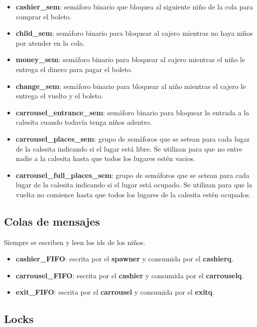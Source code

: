 \documentclass[a4paper,10pt]{article}
\begin{document}
\begin{itemize}
\item \textbf{cashier\_sem}: semáforo binario que bloquea al siguiente niño de la cola para comprar el boleto. 
\item \textbf{child\_sem}: semáforo binario para bloquear al cajero mientras no haya niños por atender en la cola.
\item \textbf{money\_sem}: semáforo binario para bloquear al cajero mientras el niño le entrega el dinero para pagar el boleto.
\item \textbf{change\_sem}: semáforo binario para bloquear al niño mientras el cajero le entrega el vuelto y el boleto.
\item \textbf{carrousel\_entrance\_sem}: semáforo binario para bloquear la entrada a la calesita cuando todavía tenga niños adentro.
\item \textbf{carrousel\_places\_sem}: grupo de semáforos que se setean para cada lugar de la calesita indicando si el lugar está libre. Se utilizan para que no entre nadie a la calesita hasta que todos los lugares estén vacios.
\item \textbf{carrousel\_full\_places\_sem}: grupo de semáforos que se setean para cada lugar de la calesita indicando si el lugar está ocupado. Se utilizan para que la vuelta no comience hasta que todos los lugares de la calesita estén ocupados.
\end{itemize}

\subsection{Colas de mensajes}

Siempre se escriben y leen los ids de los niños.

\begin{itemize}
\item \textbf{cashier\_FIFO}: escrita por el \textbf{spawner} y consumida por el \textbf{cashierq}.
\item \textbf{carrousel\_FIFO}: escrita por el \textbf{cashier} y consumida por el \textbf{carrouselq}.
\item \textbf{exit\_FIFO}: escrita por el \textbf{carrousel} y consumida por el \textbf{exitq}.
\end{itemize}

\subsection{Locks}
\end{document}
